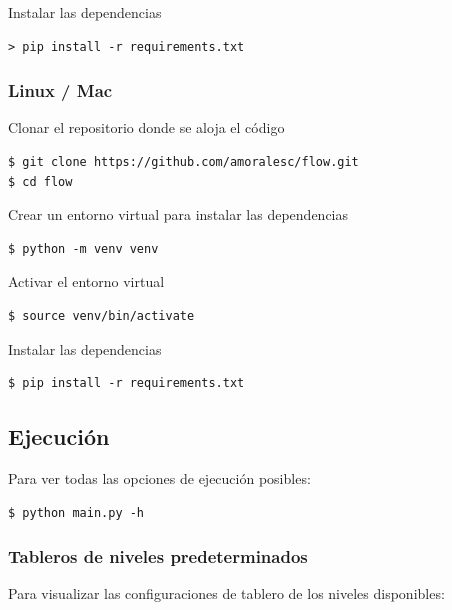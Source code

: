 \documentclass[letter,12pt]{article}
\begin{document}
Instalar las dependencias

\begin{verbatim}
> pip install -r requirements.txt
\end{verbatim}

\subsubsection{Linux / Mac} \label{documentacion:instalacion:linux}

Clonar el repositorio donde se aloja el código

\begin{verbatim}
$ git clone https://github.com/amoralesc/flow.git
$ cd flow
\end{verbatim}

Crear un entorno virtual para instalar las dependencias

\begin{verbatim}
$ python -m venv venv
\end{verbatim}

Activar el entorno virtual

\begin{verbatim}
$ source venv/bin/activate
\end{verbatim}

Instalar las dependencias

\begin{verbatim}
$ pip install -r requirements.txt
\end{verbatim}

\subsection{Ejecución} \label{documentacion:ejecucion}

Para ver todas las opciones de ejecución posibles: \par

\begin{verbatim}
$ python main.py -h
\end{verbatim}

\subsubsection{Tableros de niveles predeterminados} \label{documentacion:ejecucion:niveles}

Para visualizar las configuraciones de tablero de los niveles disponibles: \par
\end{document}
